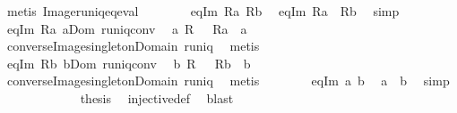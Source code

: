 \begin{isabellebody}
\ {\isacharparenleft}metis\ Image{\isacharunderscore}runiq{\isacharunderscore}eq{\isacharunderscore}eval{\isacharparenright}\isanewline
\ \ \ \ \ \ \isamarkupfalse%
\ eq{\isacharunderscore}Im\ Ra\ Rb\ \isamarkupfalse%
\ eq{\isacharunderscore}Im{\isacharprime}{\isacharcolon}\ {\isachardoublequoteopen}Ra\ {\isacharequal}\ Rb{\isachardoublequoteclose}\ \isamarkupfalse%
\ simp\isanewline
\ \ \ \ \ \ \isamarkupfalse%
\ eq{\isacharunderscore}Im{\isacharprime}\ Ra\ a{\isacharunderscore}Dom\ runiq{\isacharunderscore}conv\ \isamarkupfalse%
\ a{\isacharprime}{\isacharcolon}\ {\isachardoublequoteopen}{\isacharparenleft}R\ {\isasyminverse}{\isacharparenright}\ {\isacharbackquote}{\isacharbackquote}\ {\isacharbraceleft}Ra{\isacharbraceright}\ {\isacharequal}\ {\isacharbraceleft}a{\isacharbraceright}{\isachardoublequoteclose}\isanewline
\ \ \ \ \ \ \ \ \isamarkupfalse%
\ converse{\isacharunderscore}Image{\isacharunderscore}singleton{\isacharunderscore}Domain\ runiq\ \isamarkupfalse%
\ metis\isanewline
\ \ \ \ \ \ \isamarkupfalse%
\ eq{\isacharunderscore}Im{\isacharprime}\ Rb\ b{\isacharunderscore}Dom\ runiq{\isacharunderscore}conv\ \isamarkupfalse%
\ b{\isacharprime}{\isacharcolon}\ {\isachardoublequoteopen}{\isacharparenleft}R\ {\isasyminverse}{\isacharparenright}\ {\isacharbackquote}{\isacharbackquote}\ {\isacharbraceleft}Rb{\isacharbraceright}\ {\isacharequal}\ {\isacharbraceleft}b{\isacharbraceright}{\isachardoublequoteclose}\isanewline
\ \ \ \ \ \ \ \ \isamarkupfalse%
\ converse{\isacharunderscore}Image{\isacharunderscore}singleton{\isacharunderscore}Domain\ runiq\ \isamarkupfalse%
\ metis\isanewline
\ \ \ \ \ \ \isamarkupfalse%
\ eq{\isacharunderscore}Im{\isacharprime}\ a{\isacharprime}\ b{\isacharprime}\ \isamarkupfalse%
\ {\isachardoublequoteopen}a\ {\isacharequal}\ b{\isachardoublequoteclose}\ \isamarkupfalse%
\ simp\isanewline
\ \ \ \ \isamarkupfalse%
\isanewline
\ \ \isacommand{{\isacharbraceright}}\isamarkupfalse%
\isanewline
\ \ \isamarkupfalse%
\ \isamarkupfalse%
\ {\isacharquery}thesis\ \isamarkupfalse%
\ injective{\isacharunderscore}def\ \isamarkupfalse%
\ blast\isanewline
{}\isamarkupfalse%
%
\endisatagproof
{\isafoldproof}%
%
\isadelimproof
%
\endisadelimproof
%
\begin{isamarkuptext}%

\end{isamarkuptext}
\end{isabellebody}
